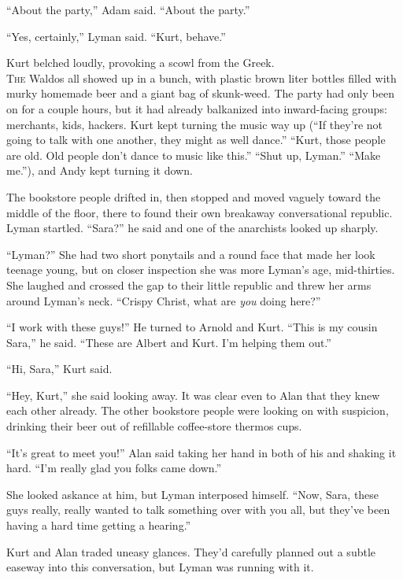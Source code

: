 ``About the party,'' Adam said.  ``About the party.''

``Yes, certainly,'' Lyman said.  ``Kurt, behave.''

Kurt belched loudly, provoking a scowl from the Greek.
\\
\lettrine[lines=3, lhang=.5, nindent=0pt, findent=2pt]{T}{he} Waldos all showed up in a bunch, with plastic brown liter bottles
filled with murky homemade beer and a giant bag of skunk-weed.  The
party had only been on for a couple hours, but it had already
balkanized into inward-facing groups:  merchants, kids, hackers.  Kurt
kept turning the music way up (``If they're not going to talk with one
another, they might as well dance.'' ``Kurt, those people are old. 
Old people don't dance to music like this.'' ``Shut up, Lyman.''
``Make me.''), and Andy kept turning it down.

The bookstore people drifted in, then stopped and moved vaguely toward
the middle of the floor, there to found their own breakaway
conversational republic.  Lyman startled.  ``Sara?'' he said and one
of the anarchists looked up sharply.

``Lyman?'' She had two short ponytails and a round face that made her
look teenage young, but on closer inspection she was more Lyman's age,
mid-thirties.  She laughed and crossed the gap to their little
republic and threw her arms around Lyman's neck.  ``Crispy Christ,
what are \textit{you} doing here?''

``I work with these guys!'' He turned to Arnold and Kurt.  ``This is
my cousin Sara,'' he said.  ``These are Albert and Kurt.  I'm helping
them out.''

``Hi, Sara,'' Kurt said.

``Hey, Kurt,'' she said looking away.  It was clear even to Alan that
they knew each other already.  The other bookstore people were looking
on with suspicion, drinking their beer out of refillable coffee-store
thermos cups.

``It's great to meet you!'' Alan said taking her hand in both of his
and shaking it hard.  ``I'm really glad you folks came down.''

She looked askance at him, but Lyman interposed himself.  ``Now, Sara,
these guys really, really wanted to talk something over with you all,
but they've been having a hard time getting a hearing.''

Kurt and Alan traded uneasy glances.  They'd carefully planned out a
subtle easeway into this conversation, but Lyman was running with it.

